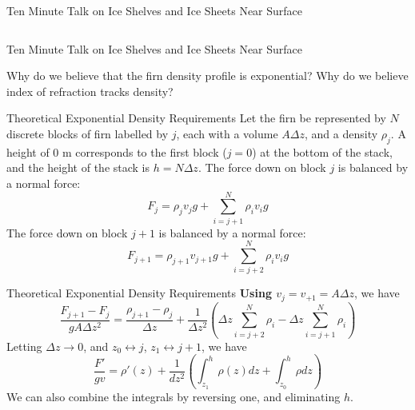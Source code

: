 \documentclass{beamer}
\begin{document}
\begin{frame}{Ten Minute Talk on Ice Shelves and Ice Sheets Near Surface}
\begin{columns}[T]
\begin{column}{0.4\textwidth}
\end{column}
\end{columns}
\end{frame}

\begin{frame}{Ten Minute Talk on Ice Shelves and Ice Sheets Near Surface}
\begin{outline}[enumerate]
\1 Why do we believe that the firn density profile is exponential? 
\1 Why do we believe index of refraction tracks density?
\end{outline}
\end{frame}

\begin{frame}{Theoretical Exponential Density Requirements}
Let the firn be represented by $N$ discrete blocks of firn labelled by $j$, each with a volume $A\Delta z$, and a density $\rho_j$.  A height of $0$ m corresponds to the first block ($j=0$) at the bottom of the stack, and the height of the stack is $h = N \Delta z$.  The force down on block $j$ is balanced by a normal force:
\begin{equation}
F_j = \rho_j v_j g + \sum_{i=j+1}^N \rho_i v_i g
\end{equation}
The force down on block $j+1$ is balanced by a normal force:
\begin{equation}
F_{j+1} = \rho_{j+1} v_{j+1} g + \sum_{i=j+2}^N \rho_i v_i g
\end{equation}
\end{frame}

\begin{frame}{Theoretical Exponential Density Requirements}
\textbf{Using $v_{j} = v_{+1} = A\Delta z$}, we have
\begin{equation}
\frac{F_{j+1}-F_{j}}{gA\Delta z^2} = \frac{\rho_{j+1}-\rho_{j}}{\Delta z} + \frac{1}{\Delta z^2}\left(\Delta z\sum_{i=j+2}^N\rho_i - \Delta z\sum_{i=j+1}^N\rho_i \right)
\end{equation}
Letting $\Delta z \rightarrow 0$, and $z_0 \leftrightarrow j$, $z_1 \leftrightarrow j+1$, we have
\begin{equation}
\frac{F'}{gv} = \rho'(z) + \frac{1}{dz^2}\left(\int_{z_1}^h \rho(z)dz + \int_{z_0}^{h}\rho dz \right)
\end{equation}
We can also combine the integrals by reversing one, and eliminating $h$.
\end{frame}
\end{document}
